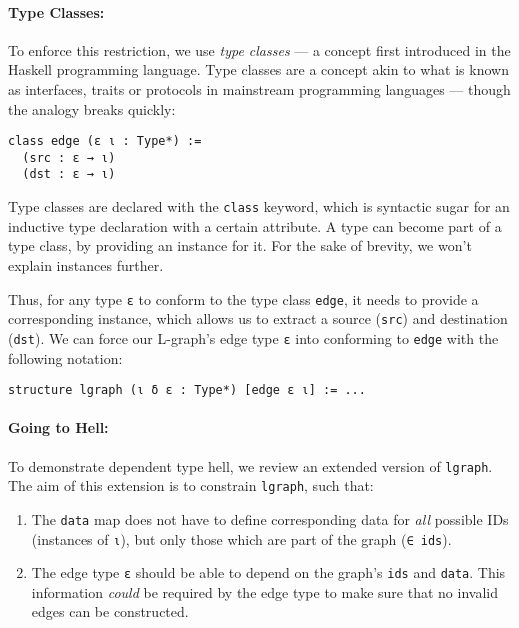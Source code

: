 \paragraph{Type Classes:}

To enforce this restriction, we use \emph{type classes} --- a concept first introduced in the Haskell programming language.
Type classes are a concept akin to what is known as interfaces, traits or protocols in mainstream programming languages --- though the analogy breaks quickly:

\begin{lstlisting}
class edge (ε ι : Type*) :=
  (src : ε → ι)
  (dst : ε → ι)
\end{lstlisting}

\noindent Type classes are declared with the \verb|class| keyword, which is syntactic sugar for an inductive type declaration with a certain attribute.
A type can become part of a type class, by providing an instance for it.
For the sake of brevity, we won't explain instances further.

Thus, for any type \lstinline{ε} to conform to the type class \lstinline{edge}, it needs to provide a corresponding instance, which allows us to extract a source (\lstinline{src}) and destination (\lstinline{dst}).
We can force our L-graph's edge type \lstinline{ε} into conforming to \lstinline{edge} with the following notation:

\begin{lstlisting}
structure lgraph (ι δ ε : Type*) [edge ε ι] := ...
\end{lstlisting}

\paragraph{Going to Hell:}

To demonstrate dependent type hell, we review an extended version of \lstinline{lgraph}.
The aim of this extension is to constrain \lstinline{lgraph}, such that:

\begin{enumerate}
  \item The \lstinline{data} map does not have to define corresponding data for \emph{all} possible IDs (instances of \lstinline{ι}), but only those which are part of the graph (\lstinline{∈ ids}).
  \item The edge type \lstinline{ε} should be able to depend on the graph's \lstinline{ids} and \lstinline{data}.
  This information \emph{could} be required by the edge type to make sure that no invalid edges can be constructed.
\end{enumerate}

